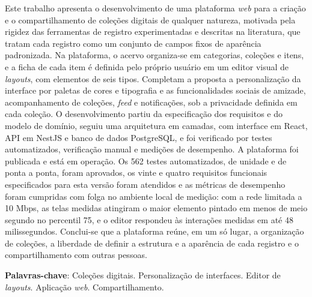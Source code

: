 \setlength{\absparsep}{18pt} %
\begin{resumo}

	Este trabalho apresenta o desenvolvimento de uma plataforma \textit{web} para a criação e o compartilhamento de coleções digitais de qualquer natureza, motivada pela rigidez das ferramentas de registro experimentadas e descritas na literatura, que tratam cada registro como um conjunto de campos fixos de aparência padronizada. Na plataforma, o acervo organiza-se em categorias, coleções e itens, e a ficha de cada item é definida pelo próprio usuário em um editor visual de \textit{layouts}, com elementos de seis tipos. Completam a proposta a personalização da interface por paletas de cores e tipografia e as funcionalidades sociais de amizade, acompanhamento de coleções, \textit{feed} e notificações, sob a privacidade definida em cada coleção. O desenvolvimento partiu da especificação dos requisitos e do modelo de domínio, seguiu uma arquitetura em camadas, com interface em React, API em NestJS e banco de dados PostgreSQL, e foi verificado por testes automatizados, verificação manual e medições de desempenho. A plataforma foi publicada e está em operação. Os 562 testes automatizados, de unidade e de ponta a ponta, foram aprovados, os vinte e quatro requisitos funcionais especificados para esta versão foram atendidos e as métricas de desempenho foram cumpridas com folga no ambiente local de medição: com a rede limitada a 10 Mbps, as telas medidas atingiram o maior elemento pintado em menos de meio segundo no percentil 75, e o editor respondeu às interações medidas em até 48 milissegundos. Conclui-se que a plataforma reúne, em um só lugar, a organização de coleções, a liberdade de definir a estrutura e a aparência de cada registro e o compartilhamento com outras pessoas.

	\vspace{\onelineskip}

	\textbf{Palavras-chave}: Coleções digitais. Personalização de interfaces. Editor de \textit{layouts}. Aplicação \textit{web}. Compartilhamento.

\end{resumo}
